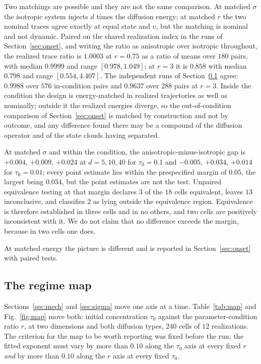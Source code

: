 \documentclass[pdflatex,sn-mathphys-num]{sn-jnl}
\theoremstyle{thmstyleone}
\theoremstyle{thmstyletwo}
\theoremstyle{thmstylethree}
\begin{document}
Two matchings are possible and they are not the same comparison. At matched $\sigma$ the isotropic system injects $d$ times the diffusion energy; at matched $r$ the two nominal traces agree exactly at equal state and $v$, but the matching is nominal and not dynamic. Paired on the shared realization index in the runs of Section~\ref{sec:onset}, and writing the ratio as anisotropic over isotropic throughout, the realized trace ratio is $1.0003$ at $r=0.75$ as a ratio of means over $180$ pairs, with median $0.9999$ and range $[0.978,1.049]$; at $r=3$ it is $0.858$ with median $0.798$ and range $[0.554,4.407]$. The independent runs of Section~\ref{sec:map} agree: $0.9988$ over $576$ in-condition pairs and $0.9637$ over $288$ pairs at $r=3$. Inside the condition the design is energy-matched in realized trajectories as well as nominally; outside it the realized energies diverge, so the out-of-condition comparison of Section~\ref{sec:onset} is matched by construction and not by outcome, and any difference found there may be a compound of the diffusion operator and of the state clouds having separated.

At matched $\sigma$ and within the condition, the anisotropic-minus-isotropic gap is $+0.004$, $+0.009$, $+0.024$ at $d=5,10,40$ for $\tau_0=0.1$ and $-0.005$, $+0.034$, $+0.014$ for $\tau_0=0.01$; every point estimate lies within the prespecified margin of $0.05$, the largest being $0.034$, but the point estimates are not the test. Unpaired equivalence testing at that margin declares $3$ of the $18$ cells equivalent, leaves $13$ inconclusive, and classifies $2$ as lying outside the equivalence region. Equivalence is therefore established in three cells and in no others, and two cells are positively inconsistent with it. We do not claim that no difference exceeds the margin, because in two cells one does.

At matched energy the picture is different and is reported in Section~\ref{sec:onset} with paired tests.

\subsection{The regime map}\label{sec:map}

Sections~\ref{sec:mech} and \ref{sec:sigma} move one axis at a time. Table~\ref{tab:map} and Fig.~\ref{fig:map} move both: initial concentration $\tau_0$ against the parameter-condition ratio $r$, at two dimensions and both diffusion types, $240$ cells of $12$ realizations. The criterion for the map to be worth reporting was fixed before the run: the fitted exponent must vary by more than $0.10$ along the $\tau_0$ axis at every fixed $r$ \emph{and} by more than $0.10$ along the $r$ axis at every fixed $\tau_0$.
\end{document}
